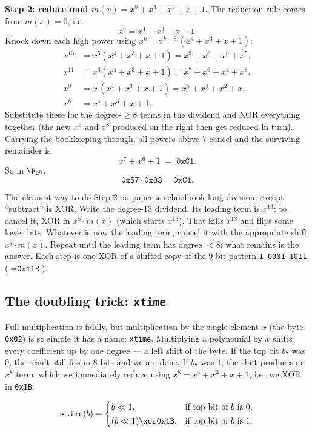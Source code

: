 \textbf{Step 2: reduce mod $m(x) = x^8+x^4+x^3+x+1$.} The reduction rule
comes from $m(x)=0$, i.e.
\[
x^8 = x^4 + x^3 + x + 1.
\]
Knock down each high power using $x^{k} = x^{k-8}\,(x^4+x^3+x+1)$:
\[
\begin{aligned}
x^{13} &= x^{5}(x^4{+}x^3{+}x{+}1) = x^{9}+x^{8}+x^{6}+x^{5},\\
x^{11} &= x^{3}(x^4{+}x^3{+}x{+}1) = x^{7}+x^{6}+x^{4}+x^{3},\\
x^{9}  &= x\,(x^4{+}x^3{+}x{+}1) = x^{5}+x^{4}+x^{2}+x,\\
x^{8}  &= x^4+x^3+x+1.
\end{aligned}
\]
Substitute these for the degree-$\geq 8$ terms in the dividend and XOR
everything together (the new $x^9$ and $x^8$ produced on the right then get
reduced in turn). Carrying the bookkeeping through, all powers above $7$
cancel and the surviving remainder is
\[
x^7 + x^6 + 1 \;=\; \texttt{0xC1}.
\]
So in $\F_{2^8}$,
\[
\texttt{0x57} \cdot \texttt{0x83} = \texttt{0xC1}.
\]

\begin{walkbox}
The cleanest way to do Step 2 on paper is schoolbook long division, except
``subtract'' is XOR. Write the degree-13 dividend. Its leading term is
$x^{13}$; to cancel it, XOR in $x^5 \cdot m(x)$ (which starts $x^{13}$).
That kills $x^{13}$ and flips some lower bits. Whatever is now the leading
term, cancel it with the appropriate shift $x^j \cdot m(x)$. Repeat until the
leading term has degree $< 8$; what remains is the answer. Each step is one
XOR of a shifted copy of the $9$-bit pattern \texttt{1\,0001\,1011}
($=\texttt{0x11B}$).
\end{walkbox}

\subsection{The doubling trick: \texttt{xtime}}

Full multiplication is fiddly, but multiplication by the single element
$x$ (the byte \texttt{0x02}) is so simple it has a name: \texttt{xtime}.
Multiplying a polynomial by $x$ shifts every coefficient up by one degree ---
a left shift of the byte. If the top bit $b_7$ was $0$, the result still fits
in $8$ bits and we are done. If $b_7$ was $1$, the shift produces an $x^8$
term, which we immediately reduce using $x^8 = x^4+x^3+x+1$, i.e.\ we XOR in
\texttt{0x1B}.

\[
\texttt{xtime}(b) =
\begin{cases}
b \ll 1, & \text{if top bit of } b \text{ is } 0,\\[2pt]
(b \ll 1) \xor \texttt{0x1B}, & \text{if top bit of } b \text{ is } 1.
\end{cases}
\]

